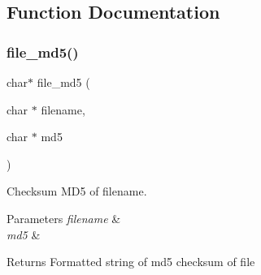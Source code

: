 \subsection{Function Documentation}
\mbox{\label{md5_8h_abb8d33df0713fc64b9e32341af87a810}} 
\subsubsection{file\+\_\+md5()}
{\footnotesize\ttfamily char$\ast$ file\+\_\+md5 (\begin{DoxyParamCaption}\item[{char $\ast$}]{filename,  }\item[{char $\ast$}]{md5 }\end{DoxyParamCaption})}



Checksum M\+D5 of filename. 


\begin{DoxyParams}{Parameters}
{\em filename} & \\
\hline
{\em md5} & \\
\hline
\end{DoxyParams}
\begin{DoxyReturn}{Returns}
Formatted string of md5 checksum of file 
\end{DoxyReturn}
